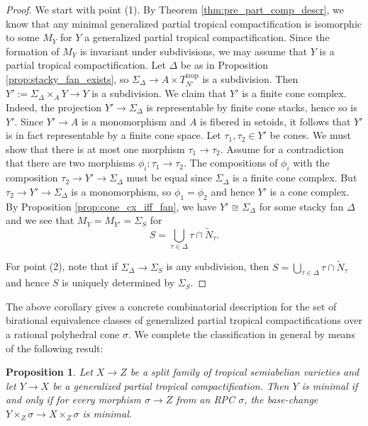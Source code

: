\documentclass[11pt]{amsart}
\newtheorem{proposition}[theorem]{Proposition}
\theoremstyle{definition}
\theoremstyle{remark}
\def\trop{\mathrm{trop}}
\begin{document}
\begin{proof}
	We start with point (1).
	By Theorem \ref{thm:pre_part_comp_descr}, we know that any minimal generalized partial tropical compactification is isomorphic
	to some $M_Y$ for $Y$ a generalized partial tropical compactification. Since the formation of $M_Y$ is invariant under subdivisions,
	we may assume that $Y$ is a partial tropical compactification. Let $\Delta$ be as in Proposition \ref{prop:stacky_fan_exists},
	so $\Sigma_{\Delta}\to A\times T_{N'}^{\trop}$ is a subdivision. Then $Y':=\Sigma_{\Delta}\times_A Y\to Y$
	is a subdivision. We claim that $Y'$ is a finite cone complex. Indeed, the projection $Y'\to \Sigma_{\Delta}$
	is representable by finite cone stacks, hence so is $Y'$. Since $Y'\to A$ is a monomorphism and $A$ is fibered in setoids, it follows
	that $Y'$ is in fact representable by a finite cone space. Let $\tau_1,\tau_2\in Y'$ be cones. We must show that there is
	at most one morphism $\tau_1\to \tau_2$. Assume for a contradiction that there are two morphisms $\phi_i:\tau_1\to \tau_2$. The
	compositions of $\phi_i$ with the composition $\tau_2\to Y'\to \Sigma_{\Delta}$ must be equal since $\Sigma_{\Delta}$ is a finite
	cone complex. But $\tau_2\to Y'\to \Sigma_{\Delta}$ is a monomorphism, so $\phi_1=\phi_2$ and hence $Y'$ is a cone complex.
	By Proposition \ref{prop:cone_cx_iff_fan}, we have $Y'\cong \Sigma_{\Delta}$ for some stacky fan $\Delta$ and we
	see that $M_Y=M_{Y'}=\Sigma_{S}$ for
	$$S=\bigcup_{\tau\in \Delta}\tau\cap \tilde{N}_{\tau}.$$

	For point (2), note that if $\Sigma_{\Delta}\to \Sigma_S$ is any subdivision, then
	$S=\bigcup_{\tau\in \Delta}\tau\cap \tilde{N}_{\tau}$ and hence $S$ is uniquely determined by $\Sigma_S$.
\end{proof}

The above corollary gives a concrete combinatorial description for the set of birational equivalence classes of generalized
partial tropical compactifications over a rational polyhedral cone $\sigma$. We complete the classification in general
by means of the following result:

\begin{proposition}
	\label{prop:minimal_iff_minimal_on_cones}
	Let $X\to Z$ be a split family of tropical semiabelian varieties and let $Y\to X$ be a generalized partial tropical compactification.
	Then $Y$ is minimal if and only if for every morphism $\sigma\to Z$ from an RPC $\sigma$, the base-change
	$Y\times_{Z}\sigma\to X\times_Z \sigma$ is minimal.
\end{proposition}
\end{document}
